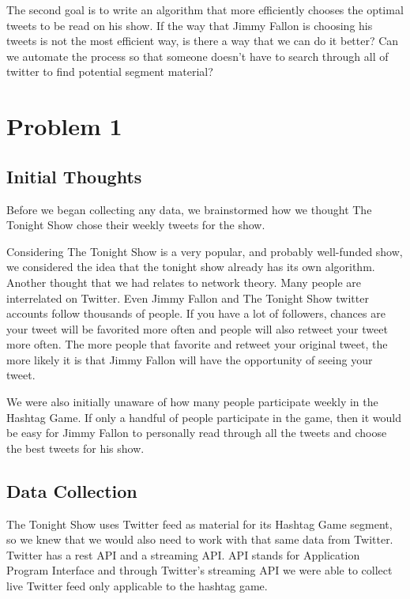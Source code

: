 \documentclass[titlepage]{article}
\begin{document}
The second goal is to write an algorithm that more efficiently chooses the optimal tweets to be read on his show. If the way that Jimmy Fallon is choosing his tweets is not the most efficient way, is there a way that we can do it better? Can we automate the process so that someone doesn't have to search through all of twitter to find potential segment material?

\section{Problem 1}

\subsection{Initial Thoughts}

Before we began collecting any data, we brainstormed how we thought The Tonight Show chose their weekly tweets for the show. 

Considering The Tonight Show is a very popular, and probably well-funded show, we considered the idea that the tonight show already has its own algorithm. Another thought that we had relates to network theory. Many people are interrelated on Twitter. Even Jimmy Fallon and The Tonight Show twitter accounts follow thousands of people. If you have a lot of followers, chances are your tweet will be favorited more often and people will also retweet your tweet more often. The more people that favorite and retweet your original tweet, the more likely it is that Jimmy Fallon will have the opportunity of seeing your tweet. 

We were also initially unaware of how many people participate weekly in the Hashtag Game. If only a handful of people participate in the game, then it would be easy for Jimmy Fallon to personally read through all the tweets and choose the best tweets for his show. 


\subsection{Data Collection}

The Tonight Show uses Twitter feed as material for its Hashtag Game segment, so we knew that we would also need to work with that same data from Twitter. Twitter has a rest API and a streaming API. API stands for Application Program Interface and through Twitter's streaming API we were able to collect live Twitter feed only applicable to the hashtag game. 
\end{document}
